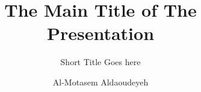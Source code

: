 \documentclass[aspectratio=169, xcolor={x11names}]{beamer}
\title{The Main Title of The Presentation}
\subtitle{Short Title Goes here}
\author{Al-Motasem Aldaoudeyeh}
\institute{North Dakota State University}
\date{}
\begin{document}
\begin{frame}
    \titlepage
\end{frame}
\end{document}
